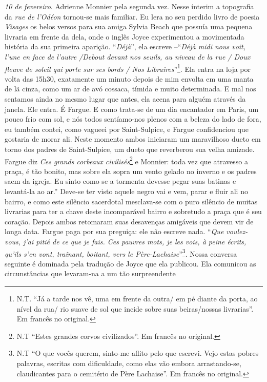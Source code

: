 \emph{10 de fevereiro}. Adrienne Monnier pela segunda vez. Nesse ínterim
a topografia da \emph{rue de l'Odéon} tornou-se mais familiar. Eu lera
no seu perdido livro de poesia \emph{Visages} os belos versos para sua
amiga Sylvia Beach que possuía uma pequena livraria em frente da dela,
onde o inglês Joyce experimentou a movimentada história da sua primeira
aparição. ``\emph{Déjà}'', ela escreve --``\emph{Déjà midi nous voit,
l'une en face de l'autre /Debout devant nos seuils, au niveau de la rue
/ Doux fleuve de soleil qui porte sur ses bords / Nos
Libraires}''\footnote{N.T. ``Já a tarde nos vê, uma em frente da outra/
  em pé diante da porta, ao nível da rua/ rio suave de sol que incide
  sobre suas beiras/nossas livrarias''. Em francês no original.}. Ela
entra na loja por volta das 15h30, exatamente um minuto depois de mim
envolta em uma manta de lã cinza, como um ar de avó cossaca, tímida e
muito determinada. E mal nos sentamos ainda no mesmo lugar que antes,
ela acena para alguém através da janela. Ele entra. É Fargue. E como
trata-se de um dia encantador em Paris, um pouco frio com sol, e nós
todos sentíamo-nos plenos com a beleza do lado de fora, eu também
contei, como vagueei por Saint-Sulpice, e Fargue confidenciou que
gostaria de morar ali. Neste momento ambos iniciaram um maravilhoso
dueto em torno dos padres de Saint-Sulpice, um dueto que reverberou sua
velha amizade. Fargue diz \emph{Ces grands corbeaux civilisés}\footnote{N.T
  ``Estes grandes corvos civilizados''. Em francês no original.} e
Monnier: toda vez que atravesso a praça, é tão bonito, mas sobre ela
sopra um vento gelado no inverno e os padres saem da igreja. Eu sinto
como se a tormenta devesse pegar suas batinas e levantá-la ao ar.''
Deve-se ter visto aquele negro vai e vem, parar e fluir ali no bairro, e
como este silêncio sacerdotal mesclava-se com o puro silêncio de muitas
livrarias para ter a chave deste incomparável bairro e sobretudo a praça
que é seu coração. Depois ambos retomaram suas desavenças amigáveis que
devem vir de longa data. Fargue paga por sua preguiça: ele não escreve
nada. ``\emph{Que voulez-vous, j'ai pitié de ce que je fais. Ces pauvres
mots, je les vois, à peine écrits, qu'ils s'en vont, traînant, boitant,
vers le Père-Lachaise}''\footnote{N.T ``O que vocês querem, sinto-me
  aflito pelo que escrevi. Vejo estas pobres palavras, escritas com
  dificuldade, como elas vão embora arrastando-se, claudicantes para o
  cemitério de Père Lachaise''. Em francês no original.}. Nossa conversa
seguinte é dominada pela tradução de Joyce que ela publicou. Ela
comunicou as circunstâncias que levaram-na a um tão surpreendente
